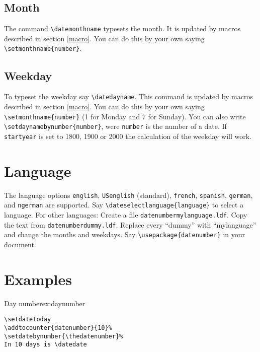 \subsection{Month\label{monthname}}

The command \verb+\datemonthname+ typesets the month. It is updated by macros described in section \ref{macro}. You can do this by your own saying \verb+\setmonthname{number}+.

\subsection{Weekday\label{dayname}}

To typeset the weekday say \verb+\datedayname+. This command is updated by macros described in section \ref{macro}.
You can do this by your own saying \verb+\setmonthname{number}+ (1 for Monday and 7 for Sunday). You can also write \verb+\setdaynamebynumber{number}+, were \verb+number+ is the number of a date. If \texttt{startyear} is set to 1800, 1900 or 2000 the calculation of the weekday will work.

\section{Language}

The language options \texttt{english}, \texttt{USenglish} (standard), \texttt{french}, \texttt{spanish}, \texttt{german}, and \texttt{ngerman} are supported. Say \verb+\dateselectlanguage{language}+ to select a language. For other languages: Create a file \texttt{datenumbermylanguage.ldf}. Copy the text from \texttt{datenumberdummy.ldf}. Replace every ``dummy'' with ``mylanguage'' and change the months and weekdays. Say \verb+\usepackage{datenumber}+ \verb++ in your document.

\section{Examples}

\begin{texexample}{Day number}{ex:daynumber}
\thedatenumber
{}
\end{texexample}


\begin{verbatim}
\setdatetoday
\addtocounter{datenumber}{10}%
\setdatebynumber{\thedatenumber}%
In 10 days is \datedate
\end{verbatim}

